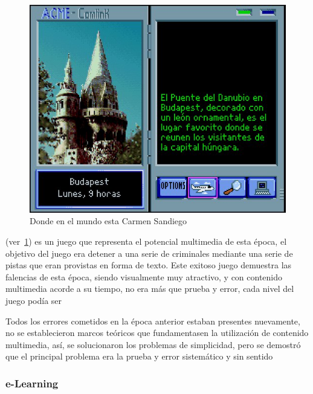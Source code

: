 \begin{figure}[ht!] 
	\centering 
	\includegraphics[scale=0.5]{tics/carmen.jpg}
	\caption{Donde en el mundo esta Carmen Sandiego} 
	\label{fig:carmen}
\end{figure}

(ver~\ref{fig:carmen}) es un juego que representa el potencial multimedia de
esta época, el objetivo del juego era detener a una serie de criminales mediante
una serie de pistas que eran provistas en forma de texto\cite{charsky:2010}.
Este exitoso juego demuestra las falencias de esta época, siendo visualmente muy
atractivo, y con contenido multimedia acorde a su tiempo, no era más que prueba
y error, cada nivel del juego podía ser 




Todos los errores cometidos en la época anterior estaban presentes nuevamente,
no se establecieron marcos teóricos que fundamentasen la utilización de
contenido multimedia, así, se solucionaron los problemas de simplicidad, pero se
demostró que el principal problema era la prueba y error sistemático y sin
sentido\cite{egenfeldt2007third} 

\subsubsection{e-Learning}

